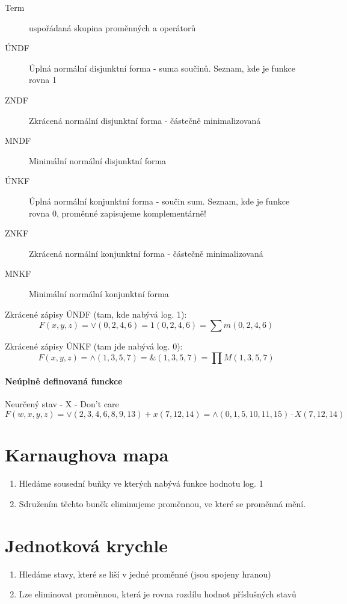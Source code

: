 \documentclass[a4wide]{report}
\begin{document}
\begin{description}
	\item[Term] uspořádaná skupina proměnných a operátorů
	\item[ÚNDF] Úplná normální disjunktní forma - suma součinů. Seznam, kde je funkce rovna 1
	\item[ZNDF] Zkrácená normální disjunktní forma - částečně minimalizovaná
	\item[MNDF] Minimální normální disjunktní forma
	\item[ÚNKF] Úplná normální konjunktní forma - součin sum. Seznam, kde je funkce rovna 0, proměnné zapisujeme komplementárně!
	\item[ZNKF] Zkrácená normální konjunktní forma - částečně minimalizovaná
	\item[MNKF] Minimální normální konjunktní forma
\end{description}

Zkrácené zápisy ÚNDF (tam, kde nabývá log. 1):
$$ F(x,y,z) = \lor(0,2,4,6) = 1(0,2,4,6) = \sum{}m(0,2,4,6)$$

Zkrácené zápisy ÚNKF (tam jde nabývá log. 0):
$$ F(x,y,z) = \land(1,3,5,7) = \&(1,3,5,7) = \prod{}M(1,3,5,7)$$

\paragraph{Neúplně definovaná funckce}
Neurčený stav - X - Don't care
$$ F(w,x,y,z) = \lor(2,3,4,6,8,9,13) + x(7,12,14) = \land(0,1,5,10,11,15) \cdot X(7,12,14)$$


\section{Karnaughova mapa}

\begin{enumerate}
	\item Hledáme sousední buňky ve kterých nabývá funkce hodnotu log. 1
	\item Sdružením těchto buněk eliminujeme proměnnou, ve které se proměnná mění.
\end{enumerate}

\section{Jednotková krychle}

\begin{enumerate}
	\item Hledáme stavy, které se liší v jedné proměnné (jsou spojeny hranou)
	\item Lze eliminovat proměnnou, která je rovna rozdílu hodnot příslušných stavů
\end{enumerate}
\end{document}
